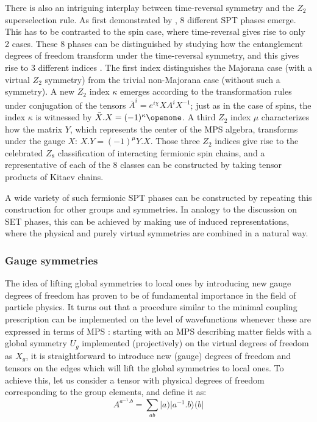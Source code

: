 \documentclass[rmp,aps,reprint,superscriptaddress,nobalancelastpage]{revtex4-1}
\newcommand{\be}{\begin{equation}}
\newcommand{\ee}{\end{equation}}
\begin{document}
There is also an intriguing interplay between time-reversal symmetry and the $Z_2$ superselection rule. As first demonstrated by \citet{fidkowski:1d-fermions}, 8 different SPT phases emerge. This has to be contrasted to the spin case, where time-reversal gives rise to only 2 cases. These 8 phases can be distinguished by studying how the entanglement degrees of freedom transform under the time-reversal symmetry, and this gives rise to 3 different indices
\cite{bultinck:fermionic-mps-phases}.
The first index distinguishes the Majorana case (with a virtual $Z_2$ symmetry) from the trivial non-Majorana case (without such a symmetry). A new $Z_2$ index $\kappa$ emerges according to the transformation rules under conjugation of the tensors $\bar{A}^i=e^{i\chi}XA^iX^{-1}$; just as in the case of spins, the index $\kappa$ is witnessed by $\bar{X}.X=(-1)^\kappa\openone$. A third $Z_2$ index $\mu$ characterizes how the matrix $Y$, which represents the center of the MPS algebra, transforms under the gauge $X$: $X.Y=(-1)^\mu Y.X$. Those three $Z_2$ indices give rise to the celebrated $Z_8$ classification of interacting fermionic spin chains, and a representative of each of the 8 classes can be constructed by taking tensor products of Kitaev chains.

A wide variety of such fermionic SPT phases can be constructed by repeating this construction for other groups and symmetries. In analogy to the discussion on SET phases, this can be achieved by making use of induced representations, where the physical and purely virtual symmetries are combined in a natural way.

\subsubsection{Gauge symmetries}

The idea of lifting global symmetries to local ones by introducing new gauge degrees of freedom has proven to be of fundamental importance in the field of particle physics. It turns out that a procedure similar to the minimal coupling prescription can be implemented on the level of wavefunctions whenever these are expressed in terms of MPS \cite{buyens2014matrix,kull2017classification}: starting with an MPS describing matter fields with a global symmetry $U_g$ implemented (projectively) on the virtual degrees of freedom as $X_g$, it is straightforward to introduce new (gauge) degrees of freedom and tensors on the edges which will lift the global symmetries to local ones. To achieve this, let us consider a tensor with physical degrees of freedom corresponding to the group elements, and define it as:
\be A^{a^{-1}.b}=\sum_{ab}|a)|a^{-1}.b\rangle(b| \label{gaugemps} \ee
\end{document}
